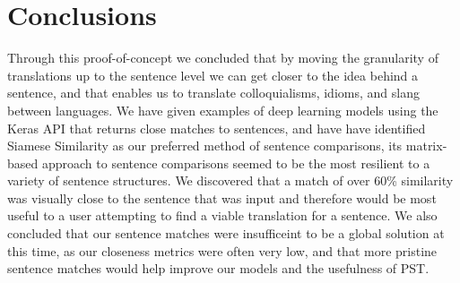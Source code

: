 \documentclass[runningheads]{llncs}
\begin{document}
	\section{Conclusions}
	Through this proof-of-concept we concluded that by moving the granularity of translations up to the sentence level we can get closer to the idea behind a sentence, and that enables us to translate colloquialisms, idioms, and slang between languages. We have given examples of deep learning models using the Keras API that returns close matches to sentences, and have have identified Siamese Similarity as our preferred method of sentence comparisons, its matrix-based approach to sentence comparisons seemed to be the most resilient to a variety of sentence structures. We discovered that a match of over 60\% similarity was visually close to the sentence that was input and therefore would be most useful to a user attempting to find a viable translation for a sentence. We also concluded that our sentence matches were insufficeint to be a global solution at this time, as our closeness metrics were often very low, and that more pristine sentence matches would help improve our models and the usefulness of PST.
\end{document}
